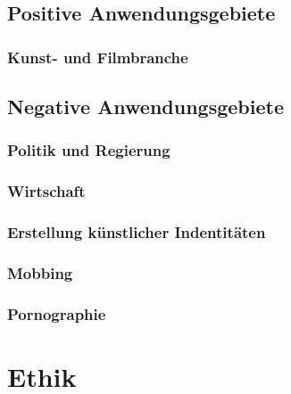 \subsection{Positive Anwendungsgebiete}
\subsubsection{Kunst- und Filmbranche}
\subsection{Negative Anwendungsgebiete}
\subsubsection{Politik und Regierung}
\subsubsection{Wirtschaft}
\subsubsection{Erstellung künstlicher Indentitäten}
\subsubsection{Mobbing}
\subsubsection{Pornographie}


\section{Ethik}